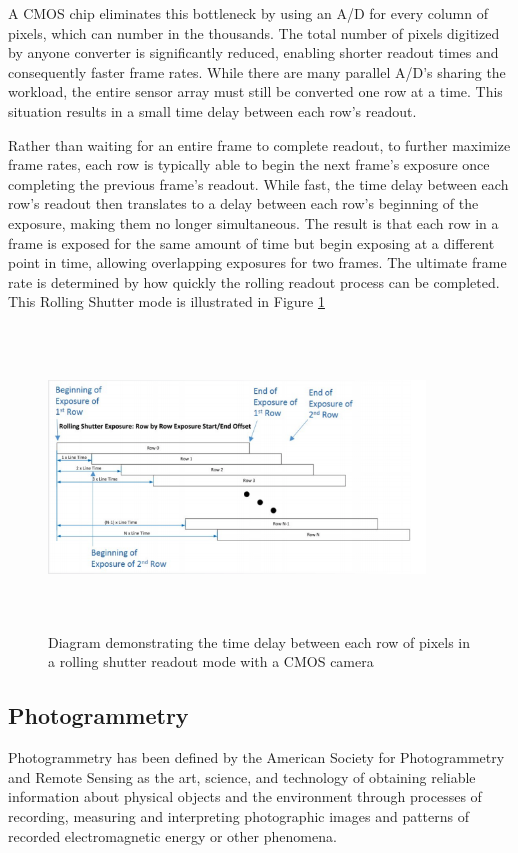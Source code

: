 A CMOS chip eliminates this bottleneck by using an A/D for every column of pixels, which can number in the thousands. The total number of pixels digitized by anyone converter is significantly reduced, enabling shorter readout times and consequently faster frame rates. While there are many parallel A/D’s sharing the workload, the entire sensor array must still be converted one row at a time. This situation results in a small time delay between each row’s readout. 

Rather than waiting for an entire frame to complete readout, to further maximize frame rates, each row is typically able to begin the next frame’s exposure once completing the previous frame’s readout. While fast, the time delay between each row’s readout then translates to a delay between each row’s beginning of the exposure, making them no longer simultaneous. The result is that each row in a frame is exposed for the same amount of time but begin exposing at a different point in time, allowing overlapping exposures for two frames. The ultimate frame rate is determined by how quickly the rolling readout process can be completed. This Rolling Shutter mode is illustrated in Figure \ref{fig:Rolling} \cite{Shutter}

\begin{figure}[H]
\centering
\includegraphics[width=10cm,height=8cm,keepaspectratio]{imagenes/Rolling.png}
\caption{Diagram demonstrating
the time delay between each row
of pixels in a rolling shutter readout
mode with a CMOS camera}
\label{fig:Rolling}
\end{figure}

\subsection{Photogrammetry}
Photogrammetry has been defined by the American Society for Photogrammetry and Remote Sensing as the art, science, and technology of obtaining reliable information about physical objects and the environment through processes of recording, measuring and interpreting photographic images and patterns of recorded electromagnetic energy or other phenomena. \cite{ASPRS}

